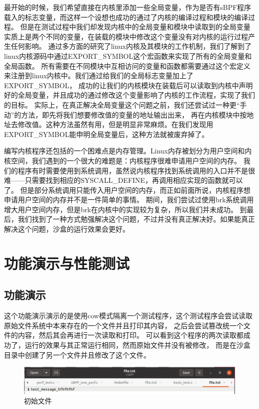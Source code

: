 \documentclass[AutoFakeBold,a4paper]{ctexart}
\begin{document}
最开始的时候，我们希望直接在内核里添加一些全局变量，作为是否有sBPF程序载入的标志变量，而这样一个设想也成功的通过了内核的编译过程和模块的编译过程。
但是在测试过程中我们却发现内核中的全局变量和模块中读取到的全局变量实质上是两个不同的变量，在装载的模块中修改这个变量没有对内核的运行过程产生任何影响。
通过多方面的研究了linux内核及其模块的工作机制，我们了解到了linux内核源码中通过{\ttfamily EXPORT\_SYMBOL}这个宏函数来实现了所有的全局变量和全局函数。
所有需要在不同模块中互相访问的变量和函数都需要通过这个宏定义来注册到linux内核中。我们通过给我们的全局标志变量加上了{\ttfamily EXPORT\_SYMBOL}，
成功的让我们的内核模块在装载后可以读取到内核中声明好的全局变量，并且成功的通过修改这个变量影响了内核的工作流程，实现了我们的目标。
实际上，在真正解决全局变量这个问题之前，我们还尝试过一种更“手动”的方法，即先将我们想要修改值的变量的地址输出出来，
再在内核模块中按地址去修改值。这种方法虽然有用，但是明显非常麻烦。在我们发现用{\ttfamily EXPORT\_SYMBOL}能申明全局变量后，这种方法就被废弃掉了。

编写内核程序还包括的一个困难点是内存管理。Linux内存被划分为用户空间和内核空间，我们遇到的一个很大的难题是：内核程序很难申请用户空间的内存。
我们的程序有时需要使用到系统调用，虽然说内核程序找到系统调用的入口并不是很难——只需要找到相应的{\ttfamily SYSCALL\_DEFINE}，再调用相应实现的函数就可以了。
但是部分系统调用只能传入用户空间的内存，而正如前面所说，内核程序想申请用户空间的内存并不是一件简单的事情。
期间，我们尝试过使用{\ttfamily brk}系统调用增大用户空间内存，但是{\ttfamily brk}在内核中的实现较为复杂，所以我们并未成功。
到最后，我们找到了一种方式勉强解决这个问题，不过并没有真正解决好。如果能真正解决这个问题，沙盒的运行效果会更好。

\section{功能演示与性能测试}
\subsection{功能演示}
这个功能演示演示的是使用cow模式隔离一个测试程序，这个测试程序会尝试读取原始文件系统中本来存在的一个文件并且打印其内容，
之后会尝试篡改统一个文件的内容，然后其会再进行一次读取和打印。 可以看到这个程序的两次读取都成功了，运行的效果与其正常运行相同，然而原始文件并没有被修改，
而是在沙盒目录中创建了另一个文件并且修改了这个文件。

\begin{figure}[H]
    \centering
    \includegraphics[width=\columnwidth]{pic8.png}
    \caption{初始文件}
\end{figure}
\end{document}
